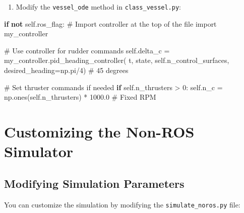 \documentclass[
  letterpaper,
  DIV=11,
  numbers=noendperiod]{scrreprt}
\newenvironment{Shaded}{\begin{snugshade}}{\end{snugshade}}
\newcommand{\CommentTok}[1]{\textcolor[rgb]{0.37,0.37,0.37}{#1}}
\newcommand{\ControlFlowTok}[1]{\textcolor[rgb]{0.00,0.23,0.31}{\textbf{#1}}}
\newcommand{\DecValTok}[1]{\textcolor[rgb]{0.68,0.00,0.00}{#1}}
\newcommand{\FloatTok}[1]{\textcolor[rgb]{0.68,0.00,0.00}{#1}}
\newcommand{\ImportTok}[1]{\textcolor[rgb]{0.00,0.46,0.62}{#1}}
\newcommand{\KeywordTok}[1]{\textcolor[rgb]{0.00,0.23,0.31}{\textbf{#1}}}
\newcommand{\NormalTok}[1]{\textcolor[rgb]{0.00,0.23,0.31}{#1}}
\newcommand{\OperatorTok}[1]{\textcolor[rgb]{0.37,0.37,0.37}{#1}}
\newcommand{\VariableTok}[1]{\textcolor[rgb]{0.07,0.07,0.07}{#1}}
\providecommand{\tightlist}{%
  \setlength{\itemsep}{0pt}\setlength{\parskip}{0pt}}\usepackage{longtable,booktabs,array}
\begin{document}
\begin{enumerate}
\def\labelenumi{\arabic{enumi}.}
\setcounter{enumi}{1}
\tightlist
\item
  Modify the \texttt{vessel\_ode} method in \texttt{class\_vessel.py}:
\end{enumerate}

\begin{Shaded}
\begin{Highlighting}[]
\ControlFlowTok{if} \KeywordTok{not} \VariableTok{self}\NormalTok{.ros\_flag:}
    \CommentTok{\# Import controller at the top of the file}
    \ImportTok{import}\NormalTok{ my\_controller}
    
    \CommentTok{\# Use controller for rudder commands}
    \VariableTok{self}\NormalTok{.delta\_c }\OperatorTok{=}\NormalTok{ my\_controller.pid\_heading\_controller(}
\NormalTok{        t, state, }\VariableTok{self}\NormalTok{.n\_control\_surfaces, desired\_heading}\OperatorTok{=}\NormalTok{np.pi}\OperatorTok{/}\DecValTok{4}\NormalTok{)  }\CommentTok{\# 45 degrees}
    
    \CommentTok{\# Set thruster commands if needed}
    \ControlFlowTok{if} \VariableTok{self}\NormalTok{.n\_thrusters }\OperatorTok{\textgreater{}} \DecValTok{0}\NormalTok{:}
        \VariableTok{self}\NormalTok{.n\_c }\OperatorTok{=}\NormalTok{ np.ones(}\VariableTok{self}\NormalTok{.n\_thrusters) }\OperatorTok{*} \FloatTok{1000.0}  \CommentTok{\# Fixed RPM}
\end{Highlighting}
\end{Shaded}

\section*{Customizing the Non-ROS
Simulator}\label{customizing-the-non-ros-simulator}


\subsection*{Modifying Simulation
Parameters}\label{modifying-simulation-parameters}

You can customize the simulation by modifying the
\texttt{simulate\_noros.py} file:
\end{document}
